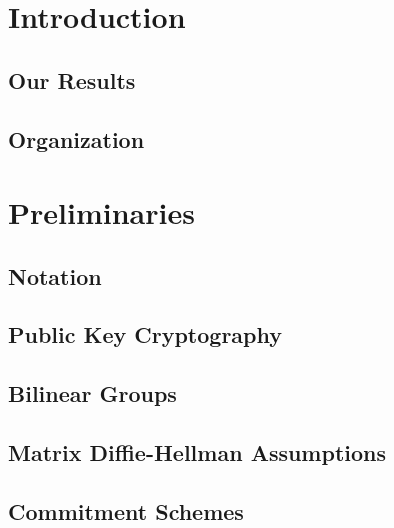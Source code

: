 \chapter{Introduction}

    

    \section{Our Results}

        

    \section{Organization}

\chapter{Preliminaries}

    \section{Notation}

    \section{Public Key Cryptography}

        

    \section{Bilinear Groups}

        

    \section{Matrix Diffie-Hellman  Assumptions} \label{sec:mddh}

        

    \section{Commitment Schemes} \label{sec:commitments}

        

